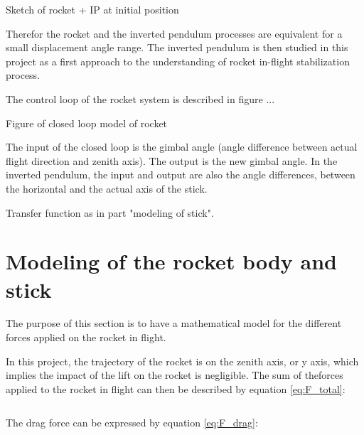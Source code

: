  Sketch of rocket + IP at initial position

Therefor the rocket and the inverted pendulum processes are equivalent for a small displacement angle range. The inverted pendulum is then studied in this project as a first approach to the understanding of rocket in-flight stabilization process.

The control loop of the rocket system is described in figure ...

Figure of closed loop model of rocket

The input of the closed loop is the gimbal angle (angle difference between actual flight direction and zenith axis). The output is the new gimbal angle. In the inverted pendulum, the input and output are also the angle differences, between the horizontal and the actual axis of the stick. 


Transfer function as in part "modeling of stick".

	\section{Modeling of the rocket body and stick}
	
The purpose of this section is to have a mathematical model for the different forces applied on the rocket in flight. 

In this project, the trajectory of the rocket is on the zenith axis, or y axis, which implies the impact of the lift on the rocket is negligible. The sum of theforces applied to the rocket in flight can then be described by equation \eqref{eq:F_total}:

\begin{equation}
\end{equation}
\startexplain
{}
\stopexplain

The drag force can be expressed by equation \eqref{eq:F_drag}:
\begin{equation}
\end{equation}
\startexplain
{}
\stopexplain
	
